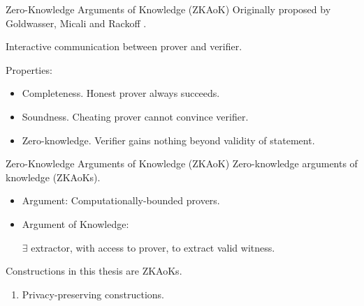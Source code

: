 \begin{frame}{Zero-Knowledge Arguments of Knowledge (ZKAoK)}
	Originally proposed by Goldwasser, Micali and Rackoff \cite{GoldwasserMR85}.\pause
	
	Interactive communication between prover and verifier.\pause
	
	Properties:\pause
	\begin{itemize}
		\item {\small Completeness. Honest prover always succeeds.}\pause
		\item {\small Soundness. Cheating prover cannot convince verifier.}\pause
		\item {\small Zero-knowledge. Verifier gains nothing beyond validity of statement.}
	\end{itemize}
\end{frame}

\begin{frame}{Zero-Knowledge Arguments of Knowledge (ZKAoK)}
	Zero-knowledge arguments of knowledge (ZKAoKs).\pause
	\begin{itemize}
		\item Argument: Computationally-bounded provers.\pause
		\item Argument of Knowledge: 
		
		$\exists$ extractor, with access to prover, to extract valid witness.\pause
	\end{itemize}

	Constructions in this thesis are ZKAoKs.\pause
	\begin{enumerate}[$\Rightarrow$]
		\item Privacy-preserving constructions.
	\end{enumerate}
\end{frame}